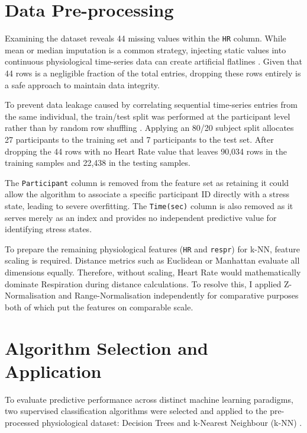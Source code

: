\documentclass[10pt, a4paper]{article}
\begin{document}
\section{Data Pre-processing}
Examining the dataset reveals 44 missing values within the \texttt{HR} column. While mean or median imputation is a common strategy, injecting static values into continuous physiological time-series data can create artificial flatlines \parencite{hayat2021missing, little2019statistical}.
Given that 44 rows is a negligible fraction of the total entries, dropping these rows entirely is a safe approach to maintain data integrity.

To prevent data leakage caused by correlating sequential time-series entries from the same individual, the train/test split was performed at the participant level rather than by random row shuffling \parencite{saeb2017need}. Applying an 80/20 subject split allocates 27 participants to the training set and 7 participants to the test set. After dropping the 44 rows with no Heart Rate value  that leaves 90,034 rows in the training samples and 22,438 in the testing samples.

 The \texttt{Participant} column is removed from the feature set as retaining it could allow the algorithm to associate a specific participant ID directly with a stress state, leading to severe overfitting. The \texttt{Time(sec)} column is also removed as it serves merely as an index and provides no independent predictive value for identifying stress states.

To prepare the remaining physiological features (\texttt{HR} and \texttt{respr}) for k-NN, feature scaling is required. Distance metrics such as Euclidean or Manhattan evaluate all dimensions equally. Therefore, without scaling, Heart Rate would mathematically dominate Respiration during distance calculations. To resolve this, I applied Z-Normalisation and Range-Normalisation independently for comparative purposes both of which put the features on comparable scale. 

\section{Algorithm Selection and Application}
To evaluate predictive performance across distinct machine learning paradigms, two supervised classification algorithms were selected and applied to the pre-processed physiological dataset: Decision Trees and k-Nearest Neighbour (k-NN) \parencite{hastie2009elements}.
\end{document}
